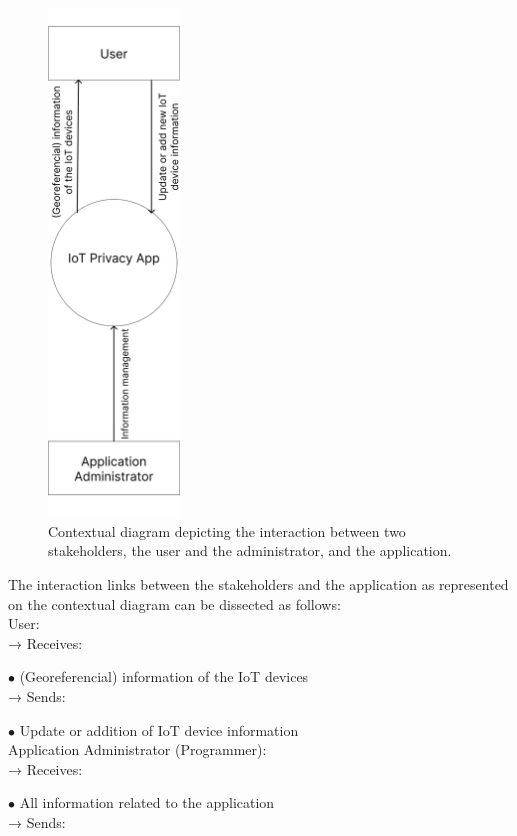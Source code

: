 \begin{figure}[H]
    \centering
    \includegraphics[width=3.5cm]{../app/docs/software_requirements/assets/images/contextual_diagram.png}
    \caption{Contextual diagram depicting the interaction between two stakeholders, the user and the administrator, and the application.}
    \label{fig:contextual diagram}
\end{figure}

The interaction links between the stakeholders and the application as represented
on the contextual diagram can be dissected as follows:\\
\newline
User: \\
\newline
→ Receives:

$\bullet$ (Georeferencial) information of the IoT devices\\
\newline
→ Sends:

$\bullet$ Update or addition of IoT device information\\
\newline
Application Administrator (Programmer): \\
\newline
→ Receives:

$\bullet$ All information related to the application\\
\newline
→ Sends:

